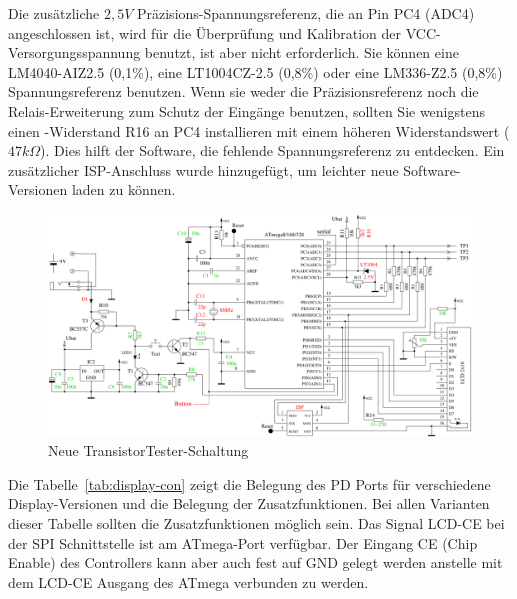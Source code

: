 Die zusätzliche \(2,5V\) Präzisions-Spannungsreferenz, die an Pin PC4 (ADC4) angeschlossen ist,
wird für die Überprüfung und Kalibration der VCC-Versorgungsspannung benutzt, ist aber nicht
erforderlich.
Sie können eine LM4040-AIZ2.5 (0,1\%),
eine LT1004CZ-2.5 (0,8\%) oder eine LM336-Z2.5 (0,8\%) Spannungsreferenz benutzen.
Wenn sie weder die Präzisionsreferenz noch die Relais-Erweiterung zum Schutz der Eingänge benutzen,
sollten Sie wenigstens einen -Widerstand R16 an PC4 installieren mit einem
höheren Widerstandswert (\(47k\Omega\)).
Dies hilft der Software, die fehlende Spannungsreferenz zu entdecken.
Ein zusätzlicher ISP-Anschluss wurde hinzugefügt, um leichter neue Software-Versionen
laden zu können.

\begin{figure}[H]
\centering
\includegraphics[width=1.0\textwidth]{../FIG/ttester.pdf}
\caption{Neue TransistorTester-Schaltung}
\label{fig:ttester}
\end{figure}

Die Tabelle~\ref{tab:display-con} zeigt die Belegung des PD Ports für verschiedene Display-Versionen
und die Belegung der Zusatzfunktionen.
Bei allen Varianten dieser Tabelle sollten die Zusatzfunktionen möglich sein.
Das Signal LCD-CE bei der SPI Schnittstelle ist am ATmega-Port verfügbar. Der Eingang CE (Chip Enable) des
Controllers kann aber auch fest auf GND gelegt werden anstelle mit dem LCD-CE Ausgang des ATmega verbunden zu werden.

